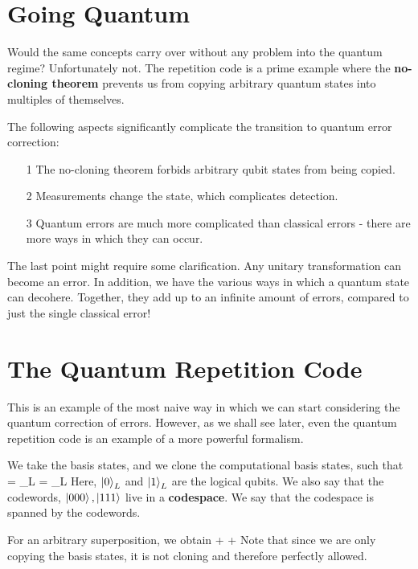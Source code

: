 \section{Going Quantum}
Would the same concepts carry over without any problem into the quantum regime? Unfortunately not. The repetition code is a prime example where the \textbf{no-cloning theorem} prevents us from copying arbitrary quantum states into multiples of themselves. 

The following aspects significantly complicate the transition to quantum error correction:
\begin{itemize}
\item[1] The no-cloning theorem forbids arbitrary qubit states from being copied. 
\item[2] Measurements change the state, which complicates detection. 
\item[3] Quantum errors are much more complicated than classical errors - there are more ways in which they can occur. 
\end{itemize}

The last point might require some clarification. Any unitary transformation can become an error. In addition, we have the various ways in which a quantum state can decohere. Together, they add up to an infinite amount of errors, compared to just the single classical error!

\section{The Quantum Repetition Code}
This is an example of the most naive way in which we can start considering the quantum correction of errors. However, as we shall see later, even the quantum repetition code is an example of a more powerful formalism. 

We take the basis states, and we clone the computational basis states, such that 
\beq
{} \rightarrow {} = _L
\eeq
\beq
{} \rightarrow {} = _L
\eeq
Here, $\ket{0}_L$ and $\ket{1}_L$ are the logical qubits. We also say that the codewords, $\ket{000}, \ket{111}$ live in a \textbf{codespace}. We say that the codespace is spanned by the codewords. 

For an arbitrary superposition, we obtain
\beq
\alpha {} + \beta {} \rightarrow \alpha {} + \beta {}
\eeq
Note that since we are only copying the basis states, it is not cloning and therefore perfectly allowed. 

